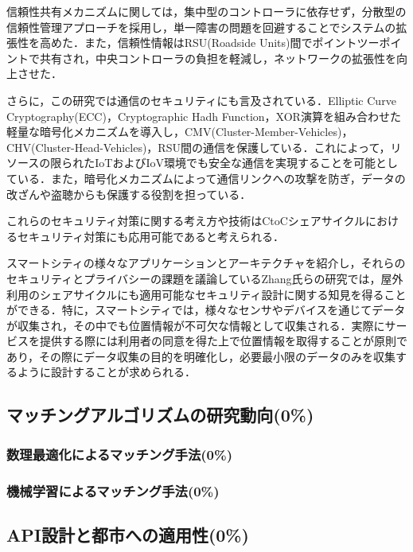           \par 信頼性共有メカニズムに関しては，集中型のコントローラに依存せず，分散型の信頼性管理アプローチを採用し，単一障害の問題を回避することでシステムの拡張性を高めた．また，信頼性情報はRSU(Roadside Units)間でポイントツーポイントで共有され，中央コントローラの負担を軽減し，ネットワークの拡張性を向上させた．
          \par さらに，この研究では通信のセキュリティにも言及されている．Elliptic Curve Cryptography(ECC)，Cryptographic Hadh Function，XOR演算を組み合わせた軽量な暗号化メカニズムを導入し，CMV(Cluster-Member-Vehicles)，CHV(Cluster-Head-Vehicles)，RSU間の通信を保護している．これによって，リソースの限られたIoTおよびIoV環境でも安全な通信を実現することを可能としている．また，暗号化メカニズムによって通信リンクへの攻撃を防ぎ，データの改ざんや盗聴からも保護する役割を担っている．
          \par これらのセキュリティ対策に関する考え方や技術はCtoCシェアサイクルにおけるセキュリティ対策にも応用可能であると考えられる．
          \par スマートシティの様々なアプリケーションとアーキテクチャを紹介し，それらのセキュリティとプライバシーの課題を議論しているZhang氏らの研究では，屋外利用のシェアサイクルにも適用可能なセキュリティ設計に関する知見を得ることができる．特に，スマートシティでは，様々なセンサやデバイスを通じてデータが収集され，その中でも位置情報が不可欠な情報として収集される．実際にサービスを提供する際には利用者の同意を得た上で位置情報を取得することが原則であり，その際にデータ収集の目的を明確化し，必要最小限のデータのみを収集するように設計することが求められる．
          
  
  \subsection{マッチングアルゴリズムの研究動向(0\%)}
    \label{sec:マッチングアルゴリズムの研究動向}
      \par 
      
      \subsubsection{数理最適化によるマッチング手法(0\%)}
        \label{sec:数理最適化によるマッチング手法}
          \par
          
      \subsubsection{機械学習によるマッチング手法(0\%)}
        \label{sec:機械学習によるマッチング手法}
          \par    
          
  \subsection{API設計と都市への適用性(0\%)}
    \label{sec:API設計と都市への適用性}
      \par 

